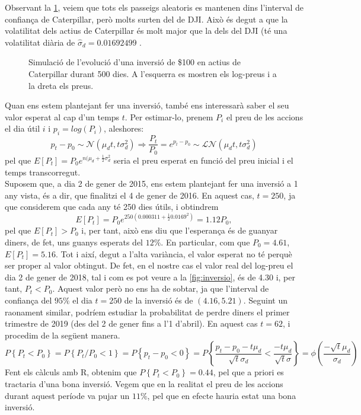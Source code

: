 \documentclass{article}
\numberwithin{table}{section}
\numberwithin{figure}{section}
\numberwithin{equation}{section}
\begin{document}
Observant la \cref{fig:simulacio}, veiem que tots els passeigs aleatoris es mantenen dins l'interval de confiança de Caterpillar, però molts surten del de DJI. Això és degut a que la volatilitat dels actius de Caterpillar és molt major que la dels del DJI (té una volatilitat diària de $\hat{\sigma}_d=0.01692499$ .
\begin{figure}[htb]
	\centering \sffamily \small
	
	\caption{Simulació de l'evolució d'una inversió de \$100 en actius de Caterpillar durant 500 dies. A l'esquerra es mostren els log-preus i a la dreta els preus.}
	\label{fig:simulacio}
\end{figure}
Quan ens estem plantejant fer una inversió, també ens interessarà saber el seu valor esperat al cap d’un temps $t$. Per estimar-lo, prenem $P_i$ el preu de les accions el dia útil $i$ i $p_i = log(P_i)$, aleshores:
\begin{equation}
    p_t-p_0\sim \mathcal{N}(\mu_d t, t\sigma_d^2)\Longrightarrow\frac{P_t}{P_0}=e^{p_t-p_0}\sim\mathcal{LN}(\mu_d t, t\sigma_d^2)
\end{equation}
pel que $E[P_t]=P_0e^{n(\mu_d+\frac{1}{2}\sigma_d^2}$ seria el preu esperat en funció del preu inicial i el temps transcorregut.\\
Suposem que, a dia 2 de gener de 2015, ens estem plantejant fer una inversió a 1 any vista, és a dir, que finalitzi el 4 de gener de 2016. En aquest cas, $t =250$, ja que considerem que cada any té 250 dies útils, i obtindrem
\begin{equation*}
   E[P_t]=P_0e^{250(0.000311+\frac{1}{2}0.0169^2)}=1.12P_0 ,
\end{equation*}
pel que $E[P_t]>P_0$ i, per tant, això ens diu que l’esperança és de guanyar diners, de fet, uns guanys esperats del $12\%$. 
En particular, com que $P_0 = 4.61$, $E[P_t] = 5.16$. Tot i així, degut a l’alta variància, el valor esperat no té perquè ser proper al valor obtingut. De fet, en el nostre cas el valor real del log-preu el dia 2 de gener de 2018, tal i com es pot veure a la \cref{fig:inversio}, és de 4.30 i, per tant, $P_t<P_0$. Aquest valor però no ens ha de sobtar, ja que l'interval de confiança del $95\%$ el dia $t=250$ de la inversió és de  $(4.16,5.21)$.
Seguint un raonament similar, podríem estudiar la probabilitat de perdre diners el primer trimestre de 2019 (des del 2 de gener fins a l'1 d'abril). En aquest cas $t=62$, i procedim de la següent manera.
\begin{equation}
    P\left\{P_t<P_0\right\}=P\left\{P_t/P_0<1\right\}=P\left\{p_t-p_0<0\right\}=P\left\{\frac{p_t-p_0-t\mu_d}{\sqrt{t}\sigma_d}<\frac{-t\mu_d}{\sqrt{t}\sigma}\right\}=\phi\left(\frac{-\sqrt{t}\mu_d}{\sigma_d}\right)
\end{equation}
Fent els càlculs amb R, obtenim que $P\left\{P_t<P_0\right\}=0.44$, pel que a priori es tractaria d'una bona inversió. Vegem que en la realitat el preu de les accions durant aquest període va pujar un $11\%$, pel que en efecte hauria estat una bona inversió.
\end{document}
